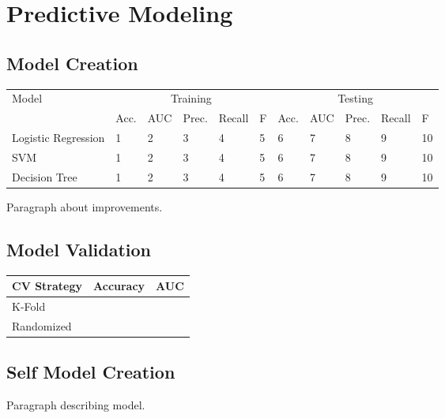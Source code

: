 \documentclass[paper=a4, fontsize=11pt]{scrartcl} %
\numberwithin{equation}{section} %
\numberwithin{figure}{section} %
\numberwithin{table}{section} %
\begin{document}

\section{Predictive Modeling}

\subsection{Model Creation}

\begin{center}
    \begin{tabular}{ | l | l | l | l | l | l | l | l | l | l | l |}
    \hline
    Model & \multicolumn{5}{c|}{Training} & \multicolumn{5}{c|}{Testing} \\ \cline{2-11}
    & Acc. & AUC & Prec. & Recall & F & Acc. & AUC & Prec. & Recall & F  \\ \hline
    Logistic Regression & 1 & 2 & 3 & 4 & 5 & 6 & 7 & 8 & 9 & 10 \\ \hline
    SVM & 1 & 2 & 3 & 4 & 5 & 6 & 7 & 8 & 9 & 10 \\ \hline
    Decision Tree & 1 & 2 & 3 & 4 & 5 & 6 & 7 & 8 & 9 & 10 \\ \hline
    \end{tabular}
\end{center}

Paragraph about improvements.

\subsection{Model Validation}

\begin{center}
    \begin{tabular}{ | l | l | l |}
    \hline
    CV Strategy & Accuracy & AUC \\ \hline
    K-Fold & & \\ \hline
    Randomized & & \\ \hline
    \hline
    \end{tabular}
\end{center}

\subsection{Self Model Creation}
Paragraph describing model.
\end{document}
